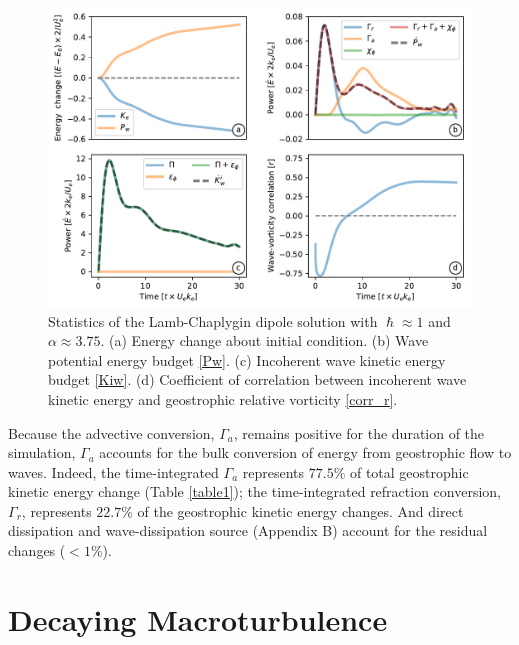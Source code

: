 \documentclass{jfm}
\begin{document}
\begin{figure}
\label{stats_lamb}
\centering
\includegraphics[width=1.\textwidth]{figs/fig2.pdf}
\caption{Statistics of the Lamb-Chaplygin dipole solution with $\hslash \approx 1$
        and $\alpha \approx 3.75$. (a) Energy change about initial condition.
        (b) Wave potential energy budget \eqref{Pw}. (c) Incoherent wave kinetic
        energy budget \eqref{Kiw}. (d) Coefficient of correlation between
        incoherent wave
        kinetic energy and geostrophic relative vorticity \eqref{corr_r}.
        }
\end{figure}

Because the advective conversion, $\Gamma_a$, remains positive for the duration
of the simulation, $\Gamma_a$ accounts for the bulk conversion of energy from
geostrophic flow to waves. Indeed, the time-integrated $\Gamma_a$ represents $77.5\%$
of total geostrophic kinetic energy change (Table \ref{table1}); the time-integrated
refraction conversion, $\Gamma_r$, represents $22.7\%$ of the geostrophic kinetic
energy changes. And direct dissipation and wave-dissipation source
(Appendix B) account for the residual changes ($<1\%$).



\clearpage
\section{Decaying Macroturbulence}
\end{document}
